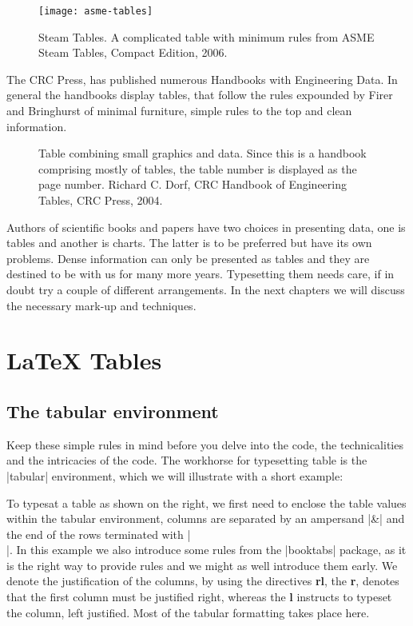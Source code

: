 \begin{figure}[htbp]
\texttt{[image: asme-tables]}
\caption{Steam Tables. A complicated table with minimum rules from ASME Steam Tables, Compact Edition, 2006. }
\end{figure}


The CRC Press, has published numerous Handbooks with Engineering Data. In general the handbooks display tables, that follow the rules expounded by Firer and Bringhurst of minimal furniture, simple rules to the top and clean information.
\begin{figure}[htbp]
\bgroup


\caption{Table combining small graphics and data. Since this is a handbook comprising mostly of tables, the table number is displayed as the page number. Richard C. Dorf, CRC Handbook of Engineering Tables, CRC Press, 2004.}
\egroup
\end{figure}

Authors of scientific books and papers have two choices in presenting data, one is tables and another is charts. The latter is to be preferred but have its own problems. Dense information can only be presented as tables and they are destined to be with us for many more years. Typesetting them needs care, if in doubt try a couple of different arrangements. In the next chapters we will discuss the necessary mark-up and techniques.

\clearpage

\chapter{LaTeX Tables}

\section{The tabular environment}

Keep these simple rules in mind before you delve into the code, the technicalities and the intricacies of the code. The \latex workhorse for typesetting table is the |tabular| environment, which we will illustrate with a short example:

To typesat a  table as shown on the right, we first need to enclose the table values within the tabular environment, columns are separated by an ampersand |&| and the end of the rows terminated with |\\|.
In this example we also introduce some rules from the |booktabs| package, as it is the right way to provide rules and we might as well introduce them early. We denote the justification of the columns, by using the directives \textbf{rl}, the \textbf{r}, denotes that the first column must be justified right, whereas the \textbf{l} instructs \latex to typeset the column, left justified. Most of the tabular formatting takes place here.

